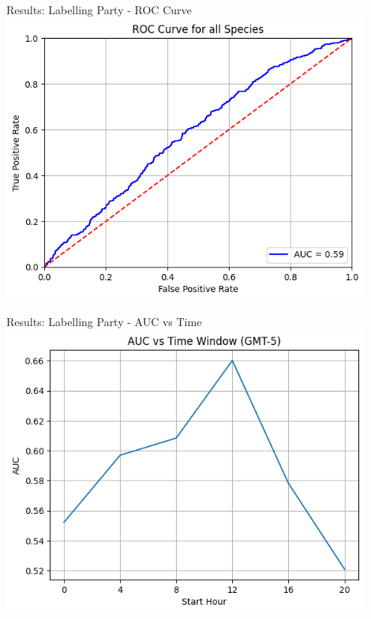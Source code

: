 


\begin{frame}{Results: Labelling Party - ROC Curve}
    \centering
    \includegraphics[height=0.9\textheight,width=0.9\textwidth,keepaspectratio]{images/ROC_Curve_original_grid.png}   
\end{frame}

\begin{frame}{Results: Labelling Party - AUC vs Time}
    \centering
    \includegraphics[height=0.9\textheight,width=0.9\textwidth,keepaspectratio]{images/AUC.png}   
\end{frame}

